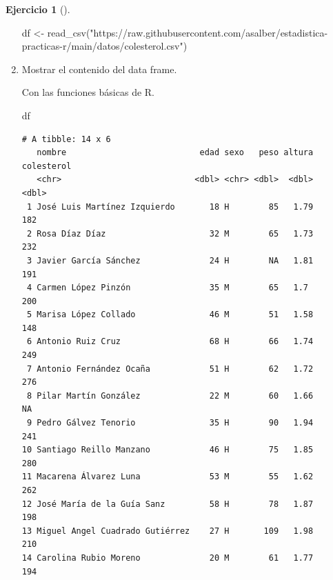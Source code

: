 \documentclass[
  a4paper,
]{scrreport}
\newenvironment{Shaded}{\begin{snugshade}}{\end{snugshade}}
\newcommand{\FunctionTok}[1]{\textcolor[rgb]{0.28,0.35,0.67}{#1}}
\newcommand{\NormalTok}[1]{\textcolor[rgb]{0.00,0.23,0.31}{#1}}
\newcommand{\OtherTok}[1]{\textcolor[rgb]{0.00,0.23,0.31}{#1}}
\newcommand{\StringTok}[1]{\textcolor[rgb]{0.13,0.47,0.30}{#1}}
\theoremstyle{definition}
\newtheorem{exercise}{Ejercicio}[chapter]
\theoremstyle{remark}
\begin{document}
\begin{exercise}[]
\begin{enumerate}
\begin{tcolorbox}
\begin{Shaded}
\begin{Highlighting}[]
\NormalTok{df }\OtherTok{\textless{}{-}} \FunctionTok{read\_csv}\NormalTok{(}\StringTok{"https://raw.githubusercontent.com/asalber/estadistica{-}practicas{-}r/main/datos/colesterol.csv"}\NormalTok{)}
\end{Highlighting}
\end{Shaded}

  \end{tcolorbox}
\item
  Mostrar el contenido del data frame.

  \begin{tcolorbox}[enhanced jigsaw, toprule=.15mm, rightrule=.15mm, arc=.35mm, colback=white, colbacktitle=quarto-callout-tip-color!10!white, toptitle=1mm, left=2mm, colframe=quarto-callout-tip-color-frame, opacityback=0, breakable, opacitybacktitle=0.6, bottomtitle=1mm, titlerule=0mm, title=\textcolor{quarto-callout-tip-color}{\faLightbulb}\hspace{0.5em}{Solución 1}, bottomrule=.15mm, coltitle=black, leftrule=.75mm]

  Con las funciones básicas de R.

\begin{Shaded}
\begin{Highlighting}[]
\NormalTok{df }
\end{Highlighting}
\end{Shaded}

\begin{verbatim}
# A tibble: 14 x 6
   nombre                           edad sexo   peso altura colesterol
   <chr>                           <dbl> <chr> <dbl>  <dbl>      <dbl>
 1 José Luis Martínez Izquierdo       18 H        85   1.79        182
 2 Rosa Díaz Díaz                     32 M        65   1.73        232
 3 Javier García Sánchez              24 H        NA   1.81        191
 4 Carmen López Pinzón                35 M        65   1.7         200
 5 Marisa López Collado               46 M        51   1.58        148
 6 Antonio Ruiz Cruz                  68 H        66   1.74        249
 7 Antonio Fernández Ocaña            51 H        62   1.72        276
 8 Pilar Martín González              22 M        60   1.66         NA
 9 Pedro Gálvez Tenorio               35 H        90   1.94        241
10 Santiago Reillo Manzano            46 H        75   1.85        280
11 Macarena Álvarez Luna              53 M        55   1.62        262
12 José María de la Guía Sanz         58 H        78   1.87        198
13 Miguel Angel Cuadrado Gutiérrez    27 H       109   1.98        210
14 Carolina Rubio Moreno              20 M        61   1.77        194
\end{verbatim}


\end{tcolorbox}
\end{enumerate}
\end{exercise}
\end{document}
